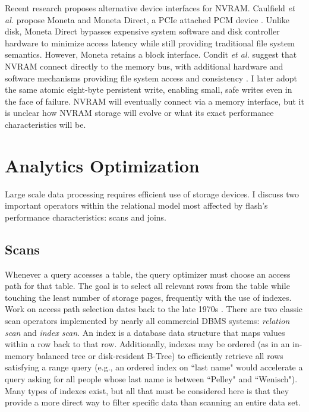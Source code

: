 Recent research proposes alternative device interfaces for NVRAM.
Caulfield \emph{et al.} propose Moneta and Moneta Direct, a PCIe attached PCM device \cite{CaulfieldMollov12}.
Unlike disk, Moneta Direct bypasses expensive system software and disk controller hardware to minimize access latency while still providing traditional file system semantics.
However, Moneta retains a block interface.
Condit \emph{et al.} suggest that NVRAM connect directly to the memory bus, with additional hardware and software mechanisms providing file system access and consistency \cite{ConditNightingale09}.
I later adopt the same atomic eight-byte persistent write, enabling small, safe writes even in the face of failure.
NVRAM will eventually connect via a memory interface, but it is unclear how NVRAM storage will evolve or what its exact performance characteristics will be.

\section{Analytics Optimization}
\label{sec:Background:Analytics}

Large scale data processing requires efficient use of storage devices.
I discuss two important operators within the relational model most affected by flash's performance characteristics: scans and joins.

\subsection{Scans}
\label{sec:Background:Scans}

Whenever a query accesses a table, the query optimizer must choose an access path for that table. 
The goal is to select all relevant rows from the table while touching the least number of storage pages, frequently with the use of indexes.
Work on access path selection dates back to the late 1970s \cite{Selinger1979}.
There are two classic scan operators implemented by nearly all commercial DBMS systems: \emph{relation scan} and \emph{index scan}.
An index is a database data structure that maps values within a row back to that row.
Additionally, indexes may be ordered (as in an in-memory balanced tree or disk-resident B-Tree) to efficiently retrieve all rows satisfying a range query (e.g., an ordered index on ``last name" would accelerate a query asking for all people whose last name is between ``Pelley" and ``Wenisch").
Many types of indexes exist, but all that must be considered here is that they provide a more direct way to filter specific data than scanning an entire data set.

